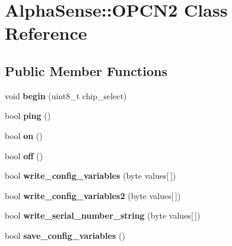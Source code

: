 \hypertarget{classAlphaSense_1_1OPCN2}{}\section{Alpha\+Sense\+:\+:O\+P\+C\+N2 Class Reference}
\label{classAlphaSense_1_1OPCN2}
\subsection*{Public Member Functions}
\begin{DoxyCompactItemize}
\item 
\mbox{\label{classAlphaSense_1_1OPCN2_a9b398879106e694eb451e4b05c0c33d6}} 
void {\bfseries begin} (uint8\+\_\+t chip\+\_\+select)
\item 
\mbox{\label{classAlphaSense_1_1OPCN2_a0d37dbaeec147fe77a205a4251353c74}} 
bool {\bfseries ping} ()
\item 
\mbox{\label{classAlphaSense_1_1OPCN2_a6e3d2ef355f2b1f31ed99d00ee4a3e2c}} 
bool {\bfseries on} ()
\item 
\mbox{\label{classAlphaSense_1_1OPCN2_ac4d281e8f3e3c7b958e33e12c3831200}} 
bool {\bfseries off} ()
\item 
\mbox{\label{classAlphaSense_1_1OPCN2_a129fc58c85b8e8ff8f6b536d8c26734c}} 
bool {\bfseries write\+\_\+config\+\_\+variables} (byte values\mbox{[}$\,$\mbox{]})
\item 
\mbox{\label{classAlphaSense_1_1OPCN2_aea6ac9c57036246046f8af098bcd9bb9}} 
bool {\bfseries write\+\_\+config\+\_\+variables2} (byte values\mbox{[}$\,$\mbox{]})
\item 
\mbox{\label{classAlphaSense_1_1OPCN2_a6df4828e1979e91bf9321a1559ef39d8}} 
bool {\bfseries write\+\_\+serial\+\_\+number\+\_\+string} (byte values\mbox{[}$\,$\mbox{]})
\item 
\mbox{\label{classAlphaSense_1_1OPCN2_a9c363e95e15f21c1c5a94914f683d3f8}} 
bool {\bfseries save\+\_\+config\+\_\+variables} ()

\end{DoxyCompactItemize}
